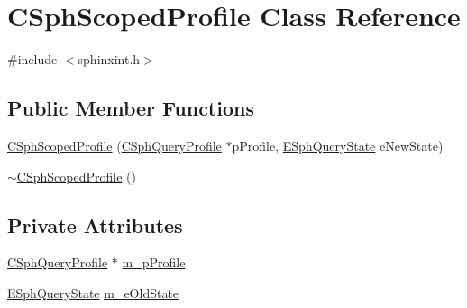 \hypertarget{classCSphScopedProfile}{\section{C\-Sph\-Scoped\-Profile Class Reference}
\label{classCSphScopedProfile}
}


{\ttfamily \#include $<$sphinxint.\-h$>$}

\subsection*{Public Member Functions}
\begin{DoxyCompactItemize}
\item 
\hyperlink{classCSphScopedProfile_a36d123230a9b33ca524369a47051fa0e}{C\-Sph\-Scoped\-Profile} (\hyperlink{classCSphQueryProfile}{C\-Sph\-Query\-Profile} $\ast$p\-Profile, \hyperlink{sphinxint_8h_a917e3d03a8db1617916e74f4d4078c06}{E\-Sph\-Query\-State} e\-New\-State)
\item 
\hyperlink{classCSphScopedProfile_a8559557e54e8d4dac9d1201feee83901}{$\sim$\-C\-Sph\-Scoped\-Profile} ()
\end{DoxyCompactItemize}
\subsection*{Private Attributes}
\begin{DoxyCompactItemize}
\item 
\hyperlink{classCSphQueryProfile}{C\-Sph\-Query\-Profile} $\ast$ \hyperlink{classCSphScopedProfile_ad09b4526c7899d122d0b9adea80fa635}{m\-\_\-p\-Profile}
\item 
\hyperlink{sphinxint_8h_a917e3d03a8db1617916e74f4d4078c06}{E\-Sph\-Query\-State} \hyperlink{classCSphScopedProfile_aa658aa76267b2c2d1495388134fa0f8f}{m\-\_\-e\-Old\-State}
\end{DoxyCompactItemize}


